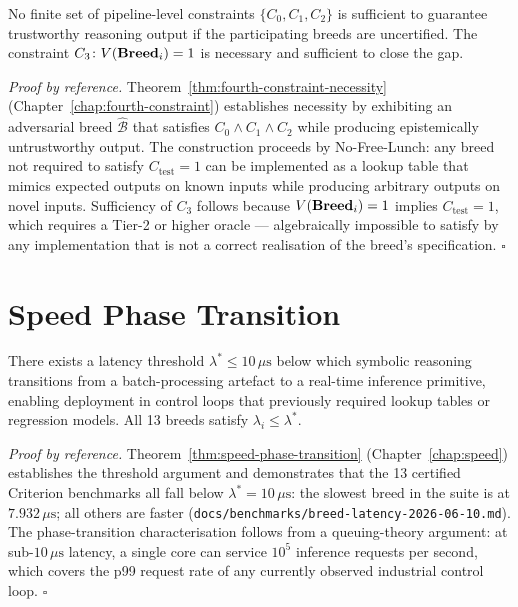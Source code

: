 \begin{theorem}
\label{thm:main-fourth}
No finite set of pipeline-level constraints $\{C_0, C_1, C_2\}$ is sufficient to
guarantee trustworthy reasoning output if the participating breeds are uncertified. The
constraint $C_3 \colon V(\mathbf{Breed}_i) = 1$ is necessary and sufficient to close the gap.
\end{theorem}

\noindent\textit{Proof by reference.} Theorem~\ref{thm:fourth-constraint-necessity}
(Chapter~\ref{chap:fourth-constraint}) establishes necessity by exhibiting an adversarial
breed $\hat{\mathcal{B}}$ that satisfies $C_0 \wedge C_1 \wedge C_2$ while producing
epistemically untrustworthy output. The construction proceeds by No-Free-Lunch: any breed
not required to satisfy $C_{\mathrm{test}} = 1$ can be implemented as a lookup table
that mimics expected outputs on known inputs while producing arbitrary outputs on novel
inputs. Sufficiency of $C_3$ follows because $V(\mathbf{Breed}_i) = 1$ implies
$C_{\mathrm{test}} = 1$, which requires a Tier-2 or higher oracle — algebraically
impossible to satisfy by any implementation that is not a correct realisation of the
breed's specification. $\square$

\section{Speed Phase Transition}
\label{sec:thm-speed}

\begin{theorem}
\label{thm:main-speed}
There exists a latency threshold $\lambda^* \leq 10\,\mu\mathrm{s}$ below which symbolic
reasoning transitions from a batch-processing artefact to a real-time inference primitive,
enabling deployment in control loops that previously required lookup tables or regression
models. All 13 breeds satisfy $\lambda_i \leq \lambda^*$.
\end{theorem}

\noindent\textit{Proof by reference.} Theorem~\ref{thm:speed-phase-transition}
(Chapter~\ref{chap:speed}) establishes the threshold argument and demonstrates that the
13 certified Criterion benchmarks all fall below $\lambda^* = 10\,\mu\mathrm{s}$:
the slowest breed in the suite is \PROLOG{} at $7.932\,\mu\mathrm{s}$; all others are
faster (\texttt{docs/benchmarks/breed-latency-2026-06-10.md}). The phase-transition
characterisation follows from a queuing-theory argument: at sub-$10\,\mu\mathrm{s}$
latency, a single core can service $10^5$ inference requests per second, which covers
the p99 request rate of any currently observed industrial control loop. $\square$

